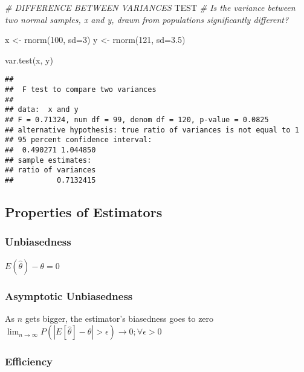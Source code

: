 \documentclass[
]{article}
\newenvironment{Shaded}{\begin{snugshade}}{\end{snugshade}}
\newcommand{\AlertTok}[1]{\textcolor[rgb]{0.94,0.16,0.16}{#1}}
\newcommand{\AttributeTok}[1]{\textcolor[rgb]{0.77,0.63,0.00}{#1}}
\newcommand{\CommentTok}[1]{\textcolor[rgb]{0.56,0.35,0.01}{\textit{#1}}}
\newcommand{\DecValTok}[1]{\textcolor[rgb]{0.00,0.00,0.81}{#1}}
\newcommand{\FloatTok}[1]{\textcolor[rgb]{0.00,0.00,0.81}{#1}}
\newcommand{\FunctionTok}[1]{\textcolor[rgb]{0.00,0.00,0.00}{#1}}
\newcommand{\NormalTok}[1]{#1}
\newcommand{\OtherTok}[1]{\textcolor[rgb]{0.56,0.35,0.01}{#1}}
\begin{document}
\begin{Shaded}
\begin{Highlighting}[]
\CommentTok{\# DIFFERENCE BETWEEN VARIANCES }\AlertTok{TEST}
\CommentTok{\# Is the variance between two normal samples, x and y, drawn from populations significantly different?}

\NormalTok{x }\OtherTok{\textless{}{-}} \FunctionTok{rnorm}\NormalTok{(}\DecValTok{100}\NormalTok{, }\AttributeTok{sd=}\DecValTok{3}\NormalTok{)}
\NormalTok{y }\OtherTok{\textless{}{-}} \FunctionTok{rnorm}\NormalTok{(}\DecValTok{121}\NormalTok{, }\AttributeTok{sd=}\FloatTok{3.5}\NormalTok{)}

\FunctionTok{var.test}\NormalTok{(x, y)}
\end{Highlighting}
\end{Shaded}

\begin{verbatim}
## 
##  F test to compare two variances
## 
## data:  x and y
## F = 0.71324, num df = 99, denom df = 120, p-value = 0.0825
## alternative hypothesis: true ratio of variances is not equal to 1
## 95 percent confidence interval:
##  0.490271 1.044850
## sample estimates:
## ratio of variances 
##          0.7132415
\end{verbatim}

\hypertarget{properties-of-estimators}{%
\subsection{Properties of Estimators}\label{properties-of-estimators}}

\hypertarget{unbiasedness}{%
\subsubsection{Unbiasedness}\label{unbiasedness}}

\(E(\hat{\theta}) - \theta = 0\)

\hypertarget{asymptotic-unbiasedness}{%
\subsubsection{Asymptotic Unbiasedness}\label{asymptotic-unbiasedness}}

As \(n\) gets bigger, the estimator's biasedness goes to zero
\(\lim_{n\to\infty} P(|E[\hat{\theta}] - \theta| > \epsilon) \to 0; \forall\epsilon >0\)

\hypertarget{efficiency}{%
\subsubsection{Efficiency}\label{efficiency}}
\end{document}
